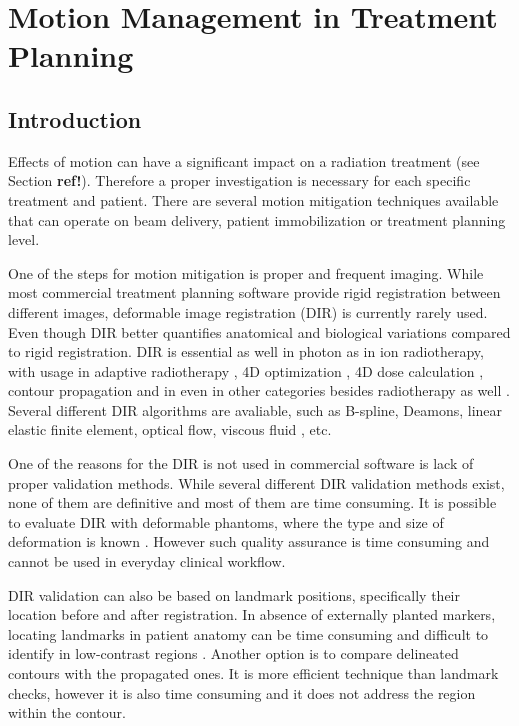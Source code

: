 \documentclass[type=dr, dr=rernat, accentcolor=tud7b,colorbacktitle, bigchapter, openright, twoside, 12pt ]{tudthesis}
\begin{document}
\chapter{Motion Management in Treatment Planning}
\label{chapter:vmm}
\minitoc

\section{Introduction}

Effects of motion can have a significant impact on a radiation treatment (see Section \textbf{ref!}). Therefore a proper investigation is necessary for each specific treatment and patient. There are several motion mitigation techniques available that can operate on beam delivery, patient immobilization or treatment planning level.

One of the steps for motion mitigation is proper and frequent imaging. While most commercial treatment planning software provide rigid registration between different images, deformable image registration (DIR) is currently rarely used. Even though DIR better quantifies anatomical and biological variations \cite{Sarrut2006} compared to rigid registration. DIR is essential as well in photon as in ion radiotherapy, with usage in adaptive radiotherapy \cite{Yan1997,Yan2010}, 4D optimization \cite{Trofimov2005}, 4D dose calculation \cite{Flampouri2006}, contour propagation \cite{Lu2006b} and in even in other categories besides radiotherapy as well \cite{Cleary2010, Herrell2012, Nithiananthan2011, Naini2010}. Several different DIR algorithms are avaliable, such as B-spline, Deamons, linear elastic finite element, optical flow, viscous fluid \cite{Rueckert1999,Venugopal2005,Zhong2007,Thirion1998,Christensen1996}, etc.
	
One of the reasons for the DIR is not used in commercial software is lack of proper validation methods. While several different DIR validation methods exist, none of them are definitive and most of them are time consuming. It is possible to evaluate DIR with deformable phantoms, where the type and size of deformation is known \cite{Kashani2007, Kirby2011}. However such quality assurance is time consuming and cannot be used in everyday clinical workflow. 

DIR validation can also be based on landmark positions, specifically their location before and after registration. In absence of externally planted markers, locating landmarks in patient anatomy can be time consuming and difficult to identify in low-contrast regions \cite{Varadhan2013}. Another option is to compare delineated contours with the propagated ones. It is more efficient technique than landmark checks, however it is also time consuming and it does not address the region within the contour.
\end{document}
